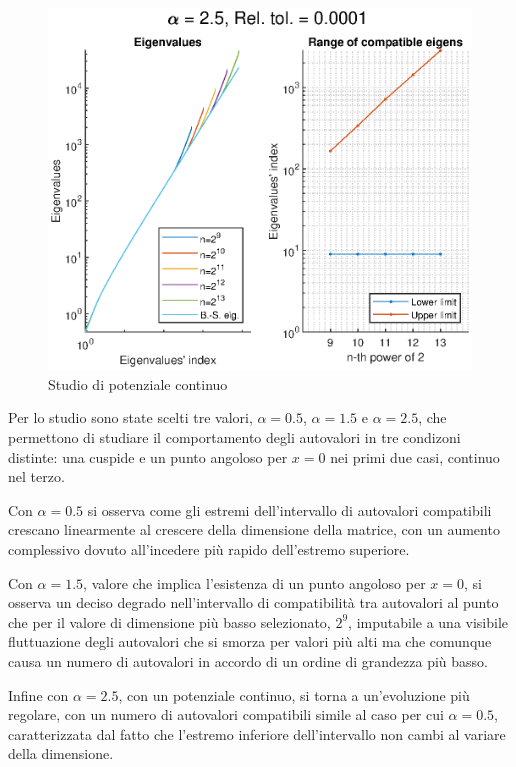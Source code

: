 \documentclass[a4paper,11pt,twoside,twocolumn]{article}
\begin{document}
\begin{figure}
    \centering
    \includegraphics[width=1.0\columnwidth]{a25}
    \caption{Studio di potenziale continuo}
    \label{f25}
\end{figure}

Per lo studio sono state scelti tre valori, \(\alpha=0.5\), \(\alpha=1.5\) e \(\alpha=2.5\), che permettono di studiare il comportamento degli autovalori in tre condizoni distinte: una cuspide e un punto angoloso per \(x=0\) nei primi due casi, continuo nel terzo. 

Con \(\alpha=0.5\) si osserva come gli estremi dell'intervallo di autovalori compatibili crescano linearmente al crescere della dimensione della matrice, con un aumento complessivo dovuto all'incedere più rapido dell'estremo superiore.

Con \(\alpha=1.5\), valore che implica l'esistenza di un punto angoloso per \(x=0\), si osserva un deciso degrado nell'intervallo di compatibilità tra autovalori al punto che per il valore di dimensione più basso selezionato, \(2^9\), imputabile a una visibile fluttuazione degli autovalori che si smorza per valori più alti ma che comunque causa un numero di autovalori in accordo di un ordine di grandezza più basso.

Infine con \(\alpha=2.5\), con un potenziale continuo, si torna a un'evoluzione più regolare, con un numero di autovalori compatibili simile al caso per cui \(\alpha=0.5\), caratterizzata dal fatto che l'estremo inferiore dell'intervallo non cambi al variare della dimensione.
\end{document}
